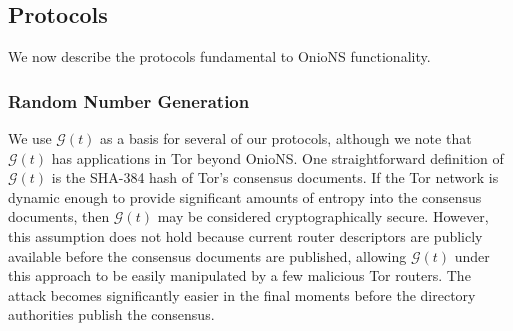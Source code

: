 \documentclass[USenglish,oneside,twocolumn]{article}
\begin{document}






\subsection{Protocols}
\label{sec:protocols}

We now describe the protocols fundamental to OnioNS functionality.%


\subsubsection{Random Number Generation}
\label{sec:rngProcess}

We use $ \mathcal{G}(t) $ as a basis for several of our protocols, although we note that $ \mathcal{G}(t) $ has applications in Tor beyond OnioNS. One straightforward definition of $ \mathcal{G}(t) $ is the SHA-384 hash of Tor's consensus documents. If the Tor network is dynamic enough to provide significant amounts of entropy into the consensus documents, then $ \mathcal{G}(t) $ may be considered cryptographically secure. However, this assumption does not hold because current router descriptors are publicly available before the consensus documents are published, allowing $ \mathcal{G}(t) $ under this approach to be easily manipulated by a few malicious Tor routers. The attack becomes significantly easier in the final moments before the directory authorities publish the consensus.
\end{document}
